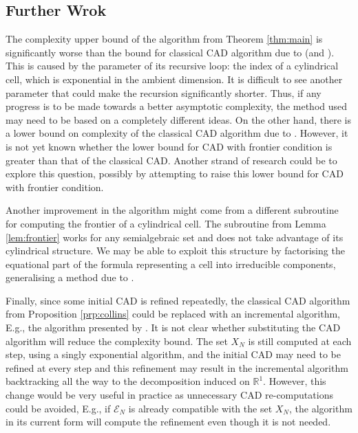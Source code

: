 \documentclass[
]{book}
\theoremstyle{definition}
\theoremstyle{definition}
\theoremstyle{definition}
\theoremstyle{definition}
\theoremstyle{remark}
\begin{document}
\hypertarget{sec:novel-frontier-fw}{%
\subsection{Further Wrok}\label{sec:novel-frontier-fw}}

The complexity upper bound of the algorithm from Theorem \ref{thm:main} is significantly worse than the bound
for classical CAD algorithm due to \citet{collins1975} (and \citet{wuthrich1976}).
This is caused by the parameter of its recursive loop: the index of a cylindrical cell, which is exponential in the ambient dimension.
It is difficult to see another parameter that could make the recursion significantly shorter. Thus, if any progress is to be made towards a better asymptotic complexity, the method used may need to be based on a completely different ideas.
On the other hand, there is a lower bound on complexity of the classical CAD algorithm due to \citet{davenportHeintz1988}. However, it is not yet known whether the lower bound for CAD with frontier condition is greater than that of the classical CAD.
Another strand of research could be to explore this question, possibly by attempting to raise this lower bound for CAD with frontier condition.

Another improvement in the algorithm might come from a different subroutine for computing the frontier
of a cylindrical cell.
The subroutine from Lemma \ref{lem:frontier} works for any semialgebraic set and does not take advantage of its
cylindrical structure.
We may be able to exploit this structure by factorising the equational part of the formula
representing a cell into irreducible components, generalising a method due to \citet{lazard10}.

Finally, since some initial CAD is refined repeatedly, the classical CAD algorithm from Proposition \ref{prp:collins} could be replaced with an incremental algorithm, E.g., the algorithm presented by \citet{kremer2020}. It is not clear whether substituting the CAD algorithm will reduce the complexity bound. The set \(X_N\) is still computed at each step, using a singly exponential algorithm, and the initial CAD may need to be refined at every step and this refinement may result in the incremental algorithm backtracking all the way to the decomposition induced on \(\mathbb{R}^1\). However, this change would be very useful in practice as unnecessary CAD re-computations could be avoided, E.g., if \(\mathcal{E}_N\) is already compatible with the set \(X_N\), the algorithm in its current form will compute the refinement even though it is not needed.
\end{document}
